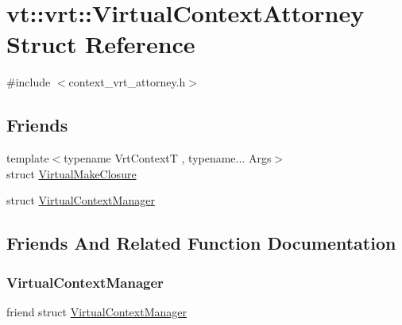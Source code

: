 \hypertarget{structvt_1_1vrt_1_1_virtual_context_attorney}{}\section{vt\+:\+:vrt\+:\+:Virtual\+Context\+Attorney Struct Reference}
\label{structvt_1_1vrt_1_1_virtual_context_attorney}


{\ttfamily \#include $<$context\+\_\+vrt\+\_\+attorney.\+h$>$}

\subsection*{Friends}
\begin{DoxyCompactItemize}
\item 
{\footnotesize template$<$typename Vrt\+ContextT , typename... Args$>$ }\\struct \hyperlink{structvt_1_1vrt_1_1_virtual_context_attorney_a6d27b32cd35d056a4d8bf6ba43f28f62}{Virtual\+Make\+Closure}
\item 
struct \hyperlink{structvt_1_1vrt_1_1_virtual_context_attorney_a93a95e040b1875a105c62f3465731412}{Virtual\+Context\+Manager}
\end{DoxyCompactItemize}


\subsection{Friends And Related Function Documentation}
\mbox{\label{structvt_1_1vrt_1_1_virtual_context_attorney_a93a95e040b1875a105c62f3465731412}} 
\subsubsection{\texorpdfstring{Virtual\+Context\+Manager}{VirtualContextManager}}
{\footnotesize\ttfamily friend struct \hyperlink{structvt_1_1vrt_1_1_virtual_context_manager}{Virtual\+Context\+Manager}\hspace{0.3cm}{\ttfamily [friend]}}

\mbox{\label{structvt_1_1vrt_1_1_virtual_context_attorney_a6d27b32cd35d056a4d8bf6ba43f28f62}} 

